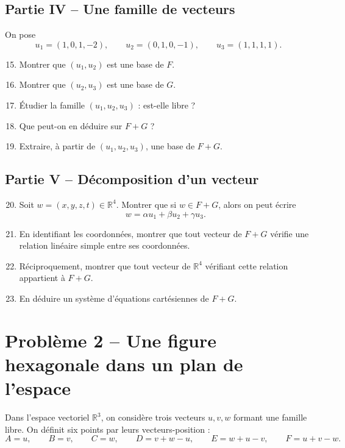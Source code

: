 \documentclass[11pt,a4paper]{article}
\newcommand{\R}{\mathbb{R}}
\begin{document}
\subsection*{Partie IV -- Une famille de vecteurs}
On pose
\[
u_1=(1,0,1,-2),\qquad u_2=(0,1,0,-1),\qquad u_3=(1,1,1,1).
\]
\begin{enumerate}[label=\arabic*.]
    \setcounter{enumi}{14}
    \item Montrer que $(u_1,u_2)$ est une base de $F$.
    \item Montrer que $(u_2,u_3)$ est une base de $G$.
    \item Étudier la famille $(u_1,u_2,u_3)$ : est-elle libre ?
    \item Que peut-on en déduire sur $F+G$ ?
    \item Extraire, à partir de $(u_1,u_2,u_3)$, une base de $F+G$.
\end{enumerate}

\subsection*{Partie V -- Décomposition d'un vecteur}
\begin{enumerate}[label=\arabic*.]
    \setcounter{enumi}{19}
    \item Soit $w=(x,y,z,t)\in\R^4$. Montrer que si $w\in F+G$, alors on peut écrire
    \[
    w=\alpha u_1+\beta u_2+\gamma u_3.
    \]
    
    \item En identifiant les coordonnées, montrer que tout vecteur de $F+G$ vérifie une relation linéaire simple entre ses coordonnées.
    
    \item Réciproquement, montrer que tout vecteur de $\R^4$ vérifiant cette relation appartient à $F+G$.
    
    \item En déduire un système d'équations cartésiennes de $F+G$.
\end{enumerate}

\section*{Problème 2 -- Une figure hexagonale dans un plan de l'espace}

Dans l'espace vectoriel $\R^3$, on considère trois vecteurs $u,v,w$ formant une famille libre.
On définit six points par leurs vecteurs-position :
\[
A=u,\qquad B=v,\qquad C=w,\qquad D=v+w-u,\qquad E=w+u-v,\qquad F=u+v-w.
\]
\end{document}
